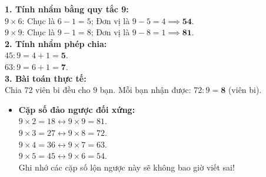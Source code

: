 \documentclass[12pt,a4paper]{article}
\begin{document}
\vspace{-2.5mm}
\noindent
\begin{minipage}[t]{0.49\textwidth}\vspace{0pt}
\begin{tcolorbox}[
  enhanced,
  colback=green!4!white,
  colframe=green!60!black,
  arc=2mm, boxrule=0.8pt,
  left=2mm, right=2mm, top=1.8mm, bottom=1.8mm,
  title={\footnotesize\bfseries\color{white}\faCheckCircle\ Ví dụ thực hành chuẩn mực}
]
{\footnotesize
\textbf{1. Tính nhẩm bằng quy tắc 9:}\\
$9 \times 6$: Chục là $6 - 1 = 5$; Đơn vị là $9 - 5 = 4 \implies \mathbf{54}$.\\
$9 \times 9$: Chục là $9 - 1 = 8$; Đơn vị là $9 - 8 = 1 \implies \mathbf{81}$.\\
\textbf{2. Tính nhẩm phép chia:}\\
$45 : 9 = 4 + 1 = \mathbf{5}$.\\
$63 : 9 = 6 + 1 = \mathbf{7}$.\\
\textbf{3. Bài toán thực tế:}\\
Chia $72$ viên bi đều cho $9$ bạn. Mỗi bạn nhận được: $72 : 9 = \mathbf{8}$ (viên bi).
}
\end{tcolorbox}
\end{minipage}
\hfill
\begin{minipage}[t]{0.49\textwidth}\vspace{0pt}
\begin{tcolorbox}[
  enhanced,
  colback=red!4!white,
  colframe=red!70!black,
  arc=2mm, boxrule=0.8pt,
  left=2mm, right=2mm, top=1.8mm, bottom=1.8mm,
  title={\footnotesize\bfseries\color{white}\faExclamationTriangle\ Mẹo tránh bẫy trắc nghiệm}
]
{\footnotesize
\begin{itemize}\setlength{\itemsep}{1.5pt}\setlength{\leftskip}{-2.5mm}
  \item \textbf{Cặp số đảo ngược đối xứng:}\\
  $9 \times 2 = 18 \leftrightarrow 9 \times 9 = 81$.\\
  $9 \times 3 = 27 \leftrightarrow 9 \times 8 = 72$.\\
  $9 \times 4 = 36 \leftrightarrow 9 \times 7 = 63$.\\
  $9 \times 5 = 45 \leftrightarrow 9 \times 6 = 54$.\\
  Ghi nhớ các cặp số lộn ngược này sẽ không bao giờ viết sai!
\end{itemize}
}
\end{tcolorbox}
\end{minipage}
\end{document}
